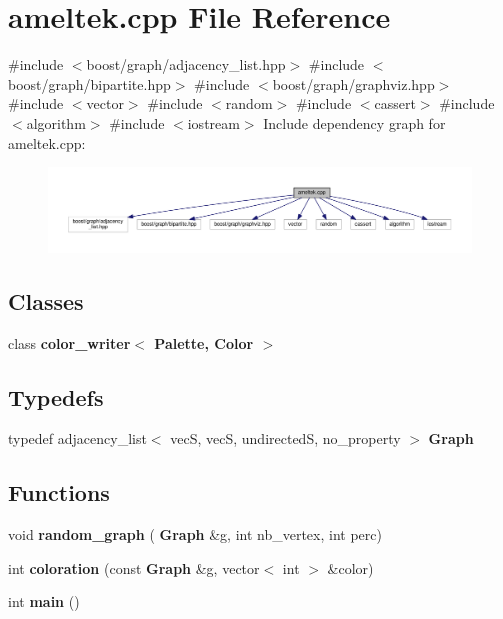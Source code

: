 \section{ameltek.\+cpp File Reference}
\label{ameltek_8cpp}
{\ttfamily \#include $<$boost/graph/adjacency\+\_\+list.\+hpp$>$}\newline
{\ttfamily \#include $<$boost/graph/bipartite.\+hpp$>$}\newline
{\ttfamily \#include $<$boost/graph/graphviz.\+hpp$>$}\newline
{\ttfamily \#include $<$vector$>$}\newline
{\ttfamily \#include $<$random$>$}\newline
{\ttfamily \#include $<$cassert$>$}\newline
{\ttfamily \#include $<$algorithm$>$}\newline
{\ttfamily \#include $<$iostream$>$}\newline
Include dependency graph for ameltek.\+cpp\+:
\nopagebreak
\begin{figure}[H]
\begin{center}
\leavevmode
\includegraphics[width=350pt]{ameltek_8cpp__incl}
\end{center}
\end{figure}
\subsection*{Classes}
\begin{DoxyCompactItemize}
\item 
class \textbf{ color\+\_\+writer$<$ Palette, Color $>$}
\end{DoxyCompactItemize}
\subsection*{Typedefs}
\begin{DoxyCompactItemize}
\item 
typedef adjacency\+\_\+list$<$ vecS, vecS, undirectedS, no\+\_\+property $>$ \textbf{ Graph}
\end{DoxyCompactItemize}
\subsection*{Functions}
\begin{DoxyCompactItemize}
\item 
void \textbf{ random\+\_\+graph} (\textbf{ Graph} \&g, int nb\+\_\+vertex, int perc)
\item 
int \textbf{ coloration} (const \textbf{ Graph} \&g, vector$<$ int $>$ \&color)
\item 
int \textbf{ main} ()
\end{DoxyCompactItemize}


